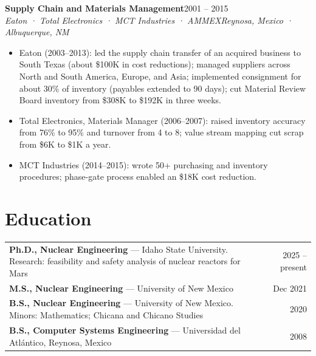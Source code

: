 \documentclass[10pt,letterpaper]{article}
\newcommand{\role}[4]{%
  \textbf{#1}\hfill{\color{muted}#3}\\
  {\itshape #2}\hfill{\color{muted}\itshape #4}\par\vspace{1pt}}
\begin{document}
\role{Supply Chain and Materials Management}{Eaton · Total Electronics · MCT Industries · AMMEX}{2001 -- 2015}{Reynosa, Mexico · Albuquerque, NM}
\begin{itemize}
  \item Eaton (2003--2013): led the supply chain transfer of an acquired business to South Texas (about \$100K in cost reductions); managed suppliers across North and South America, Europe, and Asia; implemented consignment for about 30\% of inventory (payables extended to 90 days); cut Material Review Board inventory from \$308K to \$192K in three weeks.
  \item Total Electronics, Materials Manager (2006--2007): raised inventory accuracy from 76\% to 95\% and turnover from 4 to 8; value stream mapping cut scrap from \$6K to \$1K a year.
  \item MCT Industries (2014--2015): wrote 50+ purchasing and inventory procedures; phase-gate process enabled an \$18K cost reduction.
\end{itemize}

\section{Education}
\begin{tabularx}{\linewidth}{@{}Xr@{}}
\textbf{Ph.D., Nuclear Engineering} — Idaho State University. Research: feasibility and safety analysis of nuclear reactors for Mars & 2025 -- present\\
\textbf{M.S., Nuclear Engineering} — University of New Mexico & Dec 2021\\
\textbf{B.S., Nuclear Engineering} — University of New Mexico. Minors: Mathematics; Chicana and Chicano Studies & 2020\\
\textbf{B.S., Computer Systems Engineering} — Universidad del Atlántico, Reynosa, Mexico & 2008\\
\end{tabularx}
\end{document}
